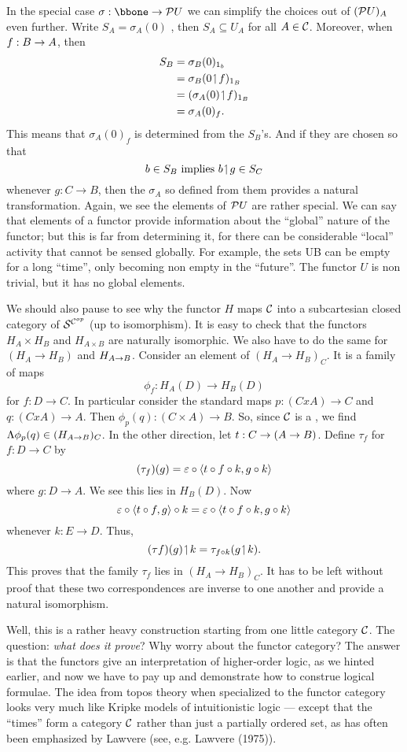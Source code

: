 In the special case $\sigma :\bbone \to \PU$ we can simplify the choices out of $(\mathcal P U)_A$
even further. Write $S_A= \sigma_A(0)$ , then $S_A\subseteq U_A$ for all $A \in \mathcal C$.
Moreover, when $f: B \rightarrow A$, then
\begin{align*}
S_B &= \sigma_B(0)_{{\mathrm 1}_b}\\
&= \sigma_B(0 \!\upharpoonleft\! f)_{{\mathrm 1} _B}\\
&= (\sigma_A(0) \!\upharpoonleft\! f)_{{\mathrm 1} _B}\\
&= \sigma_A(0)_f .
\end{align*}
This means that $\sigma_A(0)_f$ is determined from the $S_B$'s. And if they are chosen so
that
$$
b \in S_B {\textrm{ implies }} b \!\upharpoonleft\! g \in S_C
$$
whenever $g: C\to B$, then the $\sigma_A$ so defined from them provides a natural
transformation. Again, we see the elements of $\mathcal P U$ are rather special. We can say that
elements of a functor provide information about the ``global'' nature of the functor; but
this is far from determining it, for there can be considerable ``local'' activity that
cannot be sensed globally. For example, the sets UB can be empty for a long ``time'', only
becoming non empty in the ``future''. The functor $U$ is non trivial, but it has no global
elements.

We should also pause to see why the functor $H$ maps $\mathcal C$ into a subcartesian closed
category of $\mathcal S^{\mathcal C^{op}}$ (up to isomorphism). It is easy to check that the functors $H_A \times
H_B$ and $H_{A \times B}$ are naturally isomorphic. We also have to do the same for $(H_A
\to H_B)$ and $H_{A \rightarrow B}$. Consider an element of $(H_A\to H_B)_C$. It is a family of maps
$$
\phi_f : H_A(D) \to H_B(D)
$$
for $f: D\to C$. In particular consider the standard maps $p: (C x A) \to C$ and $q : (C x
A)\to A$. Then $\phi_p(q) : (C \times A)\to B$. So, since $\mathcal C$ is a \ccc, we find
$\Lambda\phi_p(q) \in (H_{A \rightarrow B})_C$. In the other direction, let $t : C\rightarrow (A \rightarrow B)$. Define
$\tau_f$ for $f : D\to C$ by
$$
(\tau_f)(g) = \varepsilon \circ \langle t \circ f \circ k, g \circ k \rangle
$$
where $g : D \to A$. We see this lies in $H_B(D)$. Now
$$
\varepsilon \circ \langle t \circ f, g\rangle \circ k = \varepsilon \circ \langle t \circ f \circ k, g \circ k\rangle
$$
whenever $k: E \to D$. Thus,
$$
(\tau f)(g) \!\upharpoonleft\! k = \tau_{f \circ k}(g \!\upharpoonleft\! k).
$$
This proves that the family $\tau_f$ lies in $(H_A \to H_B)_C$. It has to be left without
proof that these two correspondences are inverse to one another and provide a natural
isomorphism.

Well, this is a rather heavy construction starting from one little category $\mathcal C$. The
question: {\it what does it prove}? Why worry about the functor category? The answer is
that the functors give an interpretation of higher-order logic, as we hinted earlier, and
now we have to pay up and demonstrate how to construe logical formulae. The idea from
topos theory when specialized to the functor category looks very much like Kripke models
of intuitionistic logic --- except that the ``times'' form a category $\mathcal C$ rather than
just a partially ordered set, as has often been emphasized by Lawvere (see, e.g. Lawvere
(1975)).

